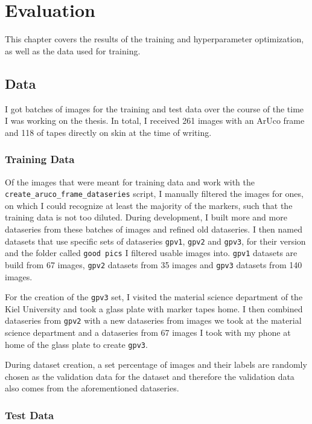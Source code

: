 \documentclass[10pt]{book}
\begin{document}
\chapter{Evaluation}
\label{chap:eval}

This chapter covers the results of the training and hyperparameter optimization, as well as the data used for training.

\section{Data}

I got batches of images for the training and test data over the course of the time I was working on the thesis. In total, I received 261 images with an \ac{ArUco} frame and 118 of tapes directly on skin at the time of writing. 

\subsection{Training Data}

Of the images that were meant for training data and work with the \texttt{create\_aruco\_frame\_dataseries} script, I manually filtered the images for ones, on which I could recognize at least the majority of the markers, such that the training data is not too diluted. During development, I built more and more dataseries from these batches of images and refined old dataseries. I then named datasets that use specific sets of dataseries \texttt{gpv1}, \texttt{gpv2} and \texttt{gpv3}, for their version and the folder called \texttt{good pics} I filtered usable images into. \texttt{gpv1} datasets are build from 67 images, \texttt{gpv2} datasets from 35 images and \texttt{gpv3} datasets from 140 images. 

For the creation of the \texttt{gpv3} set, I visited the material science department of the Kiel University and took a glass plate with marker tapes home. I then combined dataseries from \texttt{gpv2} with a new dataseries from images we took at the material science department and a dataseries from 67 images I took with my phone at home of the glass plate to create \texttt{gpv3}.

During dataset creation, a set percentage of images and their labels are randomly chosen as the validation data for the dataset and therefore the validation data also comes from the aforementioned dataseries.

\subsection{Test Data}
\end{document}
